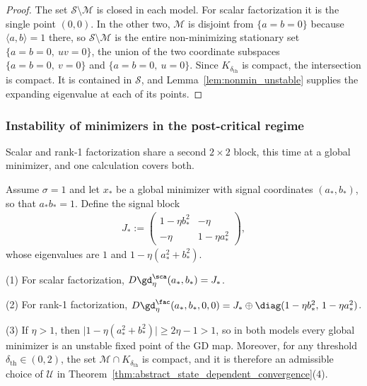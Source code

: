 \documentclass{article}
\begin{document}
\begin{proof}
The set $\mathcal S\setminus\mathcal M$ is closed in each model. For scalar
factorization it is the single point $(0,0)$. In the other two, $\mathcal M$ is
disjoint from $\{a=b=0\}$ because $\langle a,b\rangle=1$ there, so
$\mathcal S\setminus\mathcal M$ is the entire non-minimizing stationary set
$\{a=b=0,\ uv=0\}$, the union of the two coordinate subspaces
$\{a=b=0,\ v=0\}$ and
$\{a=b=0,\ u=0\}$. Since $K_{\delta_{\mathrm{th}}}$ is compact, the
intersection is compact. It is contained in $\mathcal S$, and
Lemma~\ref{lem:nonmin_unstable} supplies the expanding eigenvalue at each of
its points.
\end{proof}

\subsubsection{Instability of minimizers in the post-critical regime}
\label{subsec:minimizer_instability_eta_gt_one}

Scalar and rank-1 factorization share a second $2\times2$ block, this time at a
global minimizer, and one calculation covers both.

\begin{lemma}
\label{lem:minimizer_instability}
Assume $\sigma=1$ and let $x_\ast$ be a global
minimizer with signal coordinates $(a_\ast,b_\ast)$, so that
$a_\ast b_\ast=1$. Define the signal block
\begin{align}
    J_\ast
    :=
    \begin{pmatrix}
        1-\eta b_\ast^2 & -\eta\\
        -\eta & 1-\eta a_\ast^2
    \end{pmatrix},
    \label{eq:minimizer_signal_block}
\end{align}
whose eigenvalues are $1$ and $1-\eta(a_\ast^2+b_\ast^2)$.

(1) For scalar factorization, $D\gd_\eta^\sca(a_\ast,b_\ast)=J_\ast$.

(2) For rank-1 factorization,
$D\gd_\eta^\fac(a_\ast,b_\ast,0,0)=J_\ast\oplus\diag(1-\eta b_\ast^2,\,1-\eta a_\ast^2)$.

(3) If $\eta>1$, then
$\bigl|1-\eta(a_\ast^2+b_\ast^2)\bigr|\ge2\eta-1>1$, so in both models every
global minimizer is an unstable fixed point of the GD map. Moreover, for any
threshold $\delta_{\mathrm{th}}\in(0,2)$, the set
$\mathcal M\cap K_{\delta_{\mathrm{th}}}$ is compact, and it is therefore an
admissible choice of $\mathcal U$ in
Theorem~\ref{thm:abstract_state_dependent_convergence}(4).
\end{lemma}
\end{document}
